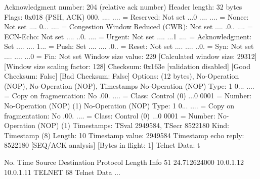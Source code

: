    Acknowledgment number: 204    (relative ack number)
    Header length: 32 bytes
    Flags: 0x018 (PSH, ACK)
        000. .... .... = Reserved: Not set
        ...0 .... .... = Nonce: Not set
        .... 0... .... = Congestion Window Reduced (CWR): Not set
        .... .0.. .... = ECN-Echo: Not set
        .... ..0. .... = Urgent: Not set
        .... ...1 .... = Acknowledgment: Set
        .... .... 1... = Push: Set
        .... .... .0.. = Reset: Not set
        .... .... ..0. = Syn: Not set
        .... .... ...0 = Fin: Not set
    Window size value: 229
    [Calculated window size: 29312]
    [Window size scaling factor: 128]
    Checksum: 0x163e [validation disabled]
        [Good Checksum: False]
        [Bad Checksum: False]
    Options: (12 bytes), No-Operation (NOP), No-Operation (NOP), Timestamps
        No-Operation (NOP)
            Type: 1
                0... .... = Copy on fragmentation: No
                .00. .... = Class: Control (0)
                ...0 0001 = Number: No-Operation (NOP) (1)
        No-Operation (NOP)
            Type: 1
                0... .... = Copy on fragmentation: No
                .00. .... = Class: Control (0)
                ...0 0001 = Number: No-Operation (NOP) (1)
        Timestamps: TSval 2949584, TSecr 8522180
            Kind: Timestamp (8)
            Length: 10
            Timestamp value: 2949584
            Timestamp echo reply: 8522180
    [SEQ/ACK analysis]
        [Bytes in flight: 1]
Telnet
    Data: t

No.     Time           Source                Destination           Protocol Length Info
     51 24.712624000   10.0.1.12             10.0.1.11             TELNET   68     Telnet Data ...

